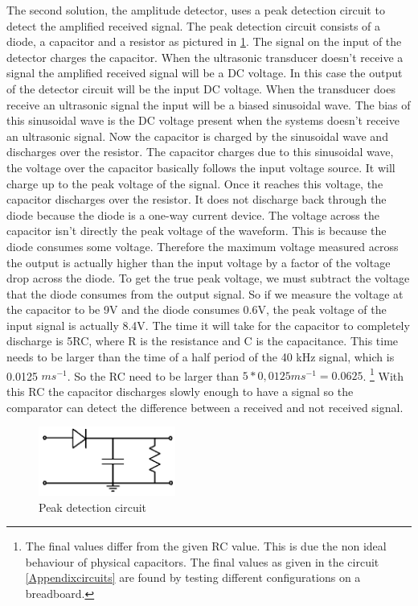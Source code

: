 The second solution, the amplitude detector, uses a peak detection circuit to detect the amplified received signal.
The peak detection circuit consists of a diode, a capacitor and a resistor as pictured in \ref{fig:peak_d}.
The signal on the input of the detector charges the capacitor.
When the ultrasonic transducer doesn't receive a signal the amplified received signal will be a DC voltage.
In this case the output of the detector circuit will be the input DC voltage.
When the transducer does receive an ultrasonic signal the input will be a biased sinusoidal wave.
The bias of this sinusoidal wave is the DC voltage present when the systems doesn't receive an ultrasonic signal.
Now the capacitor is charged by the sinusoidal wave and discharges over the resistor.
The capacitor charges due to this sinusoidal wave, the voltage over the capacitor basically follows the input voltage source. It will charge up to the peak voltage of the signal. Once it reaches this voltage, the capacitor discharges over the resistor.  It does not discharge back through the diode because the diode is a one-way current device. The voltage across the capacitor isn't directly the peak voltage of the waveform. This is because the diode consumes some voltage. Therefore the maximum voltage measured across the output is actually higher than the input voltage by a factor of the voltage drop across the diode. To get the true peak voltage, we must subtract the voltage that the diode consumes from the output signal.
So if we measure the voltage at the capacitor to be 9V and the diode consumes 0.6V, the peak voltage of the input signal is actually 8.4V. The time it will take for the capacitor to completely discharge is 5RC, where R is the resistance and C is the capacitance. This time needs to be larger than the time of a half period of the 40 kHz signal, which is 0.0125 $ms^{-1}$. So the RC need to be larger than $5 * 0,0125 ms^{-1} = 0.0625$. \footnote{The final values differ from the given RC value. This is due the non ideal behaviour of physical capacitors. The final values as given in the circuit \ref{Appendixcircuits} are found by testing different configurations on a breadboard.} With this RC the capacitor discharges slowly enough to have a signal so the comparator can detect the difference between a received and not received signal.

\begin{figure}[H]
\centering
\includegraphics[width=0.4\textwidth]{Figures/peak_d.PNG}
\caption{Peak detection circuit}
\label{fig:peak_d}
\end{figure}

